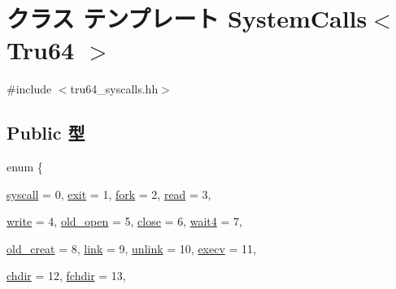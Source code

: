 \hypertarget{classSystemCalls_3_01Tru64_01_4}{
\section{クラス テンプレート SystemCalls$<$ Tru64 $>$}
\label{classSystemCalls_3_01Tru64_01_4}
}


{\ttfamily \#include $<$tru64\_\-syscalls.hh$>$}\subsection*{Public 型}
\begin{DoxyCompactItemize}
\item 
enum \{ \par
\hyperlink{classSystemCalls_3_01Tru64_01_4_ad63240694c6dc2a28c24bfc2db90ad7aaa4cde276fabc8006d7c18ae314f1d1eb}{syscall} =  0, 
\hyperlink{classSystemCalls_3_01Tru64_01_4_ad63240694c6dc2a28c24bfc2db90ad7aae08b55c4f61586473184faa2be138839}{exit} =  1, 
\hyperlink{classSystemCalls_3_01Tru64_01_4_ad63240694c6dc2a28c24bfc2db90ad7aa98087b5ebe788a8187c08b6c761e1026}{fork} =  2, 
\hyperlink{classSystemCalls_3_01Tru64_01_4_ad63240694c6dc2a28c24bfc2db90ad7aaea7c12cb3031ad9e88104ce9859ce1c5}{read} =  3, 
\par
\hyperlink{classSystemCalls_3_01Tru64_01_4_ad63240694c6dc2a28c24bfc2db90ad7aaae835b662be01cdc3752f7db84529cca}{write} =  4, 
\hyperlink{classSystemCalls_3_01Tru64_01_4_ad63240694c6dc2a28c24bfc2db90ad7aa8ad8b7e190f6fa8fb787c0ff1f9c012b}{old\_\-open} =  5, 
\hyperlink{classSystemCalls_3_01Tru64_01_4_ad63240694c6dc2a28c24bfc2db90ad7aa0e138778cc54066b56cf338b3cc732a2}{close} =  6, 
\hyperlink{classSystemCalls_3_01Tru64_01_4_ad63240694c6dc2a28c24bfc2db90ad7aa07990a909cc5bcfd5bda0d9e782ad335}{wait4} =  7, 
\par
\hyperlink{classSystemCalls_3_01Tru64_01_4_ad63240694c6dc2a28c24bfc2db90ad7aab3c49583e5e1c7f802251b85e4083fd2}{old\_\-creat} =  8, 
\hyperlink{classSystemCalls_3_01Tru64_01_4_ad63240694c6dc2a28c24bfc2db90ad7aa9fcbf86285776148954d94ec6220357e}{link} =  9, 
\hyperlink{classSystemCalls_3_01Tru64_01_4_ad63240694c6dc2a28c24bfc2db90ad7aa61077624c321ee60189afae70e9137ea}{unlink} =  10, 
\hyperlink{classSystemCalls_3_01Tru64_01_4_ad63240694c6dc2a28c24bfc2db90ad7aa33bcf21532d8ecd5fac3e5488246dc96}{execv} =  11, 
\par
\hyperlink{classSystemCalls_3_01Tru64_01_4_ad63240694c6dc2a28c24bfc2db90ad7aa93124c8b4561b902442d8481d94a66c3}{chdir} =  12, 
\hyperlink{classSystemCalls_3_01Tru64_01_4_ad63240694c6dc2a28c24bfc2db90ad7aac5aedb17703f897ea95b9a00ee40822d}{fchdir} =  13, 

\end{DoxyCompactItemize}
